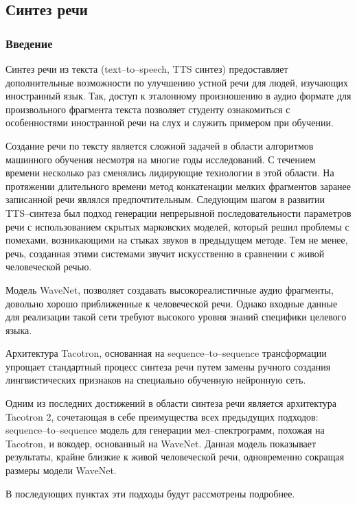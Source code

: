 \subsection{Синтез речи}
\subsubsection{Введение}
Синтез речи из текста (text--to--speech, TTS синтез) предоставляет дополнительные возможности по улучшению устной речи для людей, изучающих иностранный язык. Так, доступ к эталонному произношению в аудио формате для произвольного фрагмента текста позволяет студенту ознакомиться с особенностями иностранной речи на слух и служить примером при обучении.

Создание речи по тексту является сложной задачей в области алгоритмов машинного обучения несмотря на многие годы исследований\cite{taylor2009text}. С течением времени несколько раз сменялись лидирующие технологии в этой области. На протяжении длительного времени метод конкатенации мелких фрагментов заранее записанной речи\cite{hunt1996unit} являлся предпочтительным. Следующим шагом в развитии TTS--синтеза был подход генерации непрерывной последовательности параметров речи с использованием скрытых марковских моделей\cite{tokuda2000speech}, который решил проблемы с помехами, возникающими на стыках звуков в предыдущем методе. Тем не менее, речь, созданная этими системами звучит искусственно в сравнении с живой человеческой речью.

Модель WaveNet\cite{oord2016wavenet}, позволяет создавать высокореалистичные аудио фрагменты, довольно хорошо приближенные к человеческой речи. Однако входные данные для реализации такой сети требуют высокого уровня знаний специфики целевого языка.

Архитектура Tacotron, основанная на sequence--to--sequence трансформации упрощает стандартный процесс синтеза речи путем замены ручного создания лингвистических признаков на специально обученную нейронную сеть.

Одним из последних достижений в области синтеза речи является архитектура Tacotron 2\cite{shen2018natural}, сочетающая в себе преимущества всех предыдущих подходов: sequence--to--sequence модель для генерации мел--спектро\-грамм, похожая на Tacotron, и вокодер, основанный на WaveNet. Данная модель показывает результаты, крайне близкие к живой человеческой речи, одновременно сокращая размеры модели WaveNet.

В последующих пунктах эти подходы будут рассмотрены подробнее.

